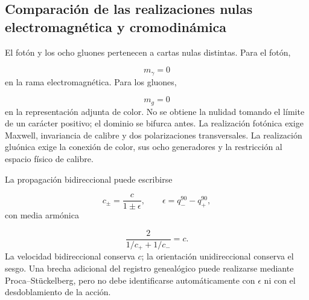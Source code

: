 
\subsection{Comparación de las realizaciones nulas electromagnética y cromodinámica}
El fotón y los ocho gluones pertenecen a cartas nulas distintas. Para el fotón,

\[
m_\gamma=0
\]
en la rama electromagnética. Para los gluones,

\[
m_g=0
\]
en la representación adjunta de color. No se obtiene la nulidad tomando el límite de un carácter positivo; el dominio se bifurca antes. La realización fotónica exige Maxwell, invariancia de calibre y dos polarizaciones transversales. La realización gluónica exige la conexión de color, sus ocho generadores y la restricción al espacio físico de calibre.

La propagación bidireccional puede escribirse

\[
c_\pm=\frac{c}{1\pm\epsilon},
\qquad
\epsilon=q_-^{90}-q_+^{90},
\]
con media armónica

\[
\frac{2}{1/c_++1/c_-}=c.
\]
La velocidad bidireccional conserva \(c\); la orientación unidireccional conserva el sesgo. Una brecha adicional del registro genealógico puede realizarse mediante Proca--Stückelberg, pero no debe identificarse automáticamente con \(\epsilon\) ni con el desdoblamiento de la acción.

